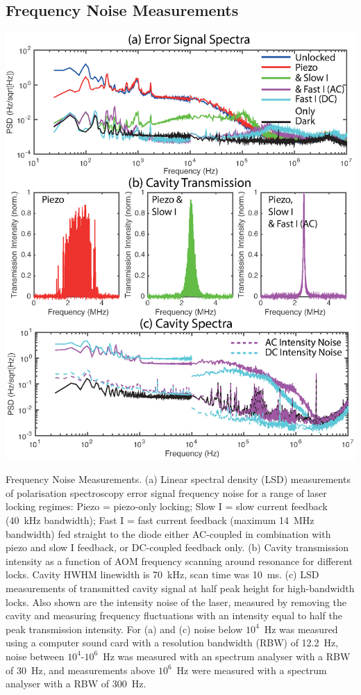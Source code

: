 \documentclass[10pt,letterpaper]{article}
\newenvironment{Figure}
  {\par\medskip\noindent\minipage{\linewidth}}
  {\endminipage\par\medskip}
\begin{document}
\subsection{Frequency Noise Measurements}

\begin{Figure}
    \centering
    \captionsetup{type=figure}
    \includegraphics[width=\linewidth]{Figs/150904_SpectralDensityPlotsV102.eps}
    \caption{Frequency Noise Measurements. (a) Linear spectral density (LSD) measurements of polarisation spectroscopy error signal frequency noise for a range of laser locking regimes: Piezo = piezo-only locking; Slow I = slow current feedback (40~kHz bandwidth); Fast I = fast current feedback (maximum 14~MHz bandwidth) fed straight to the diode either AC-coupled in combination with piezo and slow I feedback, or DC-coupled feedback only. (b) Cavity transmission intensity as a function of AOM frequency scanning around resonance for different locks. Cavity HWHM linewidth is 70~kHz, scan time was 10~ms. (c) LSD measurements of transmitted cavity signal at half peak height for high-bandwidth locks. Also shown are the intensity noise of the laser, measured by removing the cavity and measuring frequency fluctuations with an intensity equal to half the peak transmission intensity. For (a) and (c) noise below $10^4$~Hz was measured using a computer sound card with a resolution bandwidth (RBW) of 12.2~Hz, noise between $10^4$-$10^6$~Hz was measured with an spectrum analyser with a RBW of 30~Hz, and measurements above $10^6$~Hz were measured with a spectrum analyser with a RBW of 300~Hz.}

\end{Figure}
\end{document}
